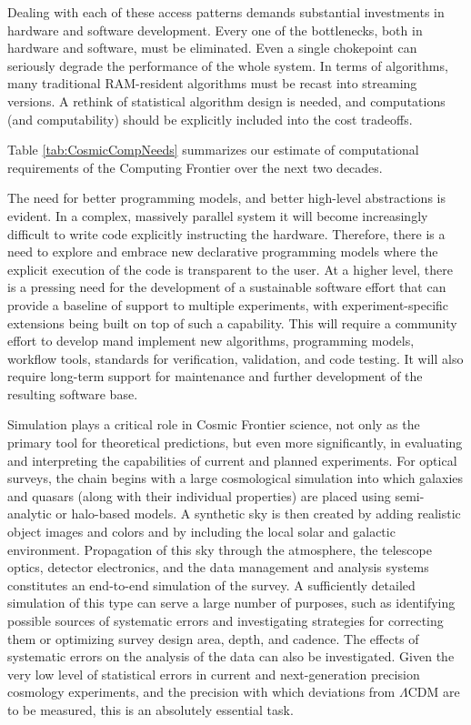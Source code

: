 Dealing with each of these access patterns demands substantial
investments in hardware and software development. 
Every one of the bottlenecks, both in
hardware and software, must be eliminated.  Even a single chokepoint can
seriously degrade the performance of the whole system. In terms of
algorithms, many traditional RAM-resident algorithms must be recast
into streaming versions. A rethink of statistical algorithm design is
needed, and computations (and computability) should be explicitly
included into the cost tradeoffs.

Table \ref{tab:CosmicCompNeeds} summarizes our estimate of 
computational requirements of the Computing Frontier over the next two decades.

The need for better programming models, and better high-level
abstractions is evident. In a complex, massively parallel system it
will become increasingly difficult to write code explicitly
instructing the hardware. Therefore, there is a need to explore and
embrace new declarative programming models where the explicit
execution of the code is transparent to the user. At a higher level,
there is a pressing need for the development of a sustainable software
effort that can provide a baseline of support to multiple experiments,
with experiment-specific extensions being built on top of such a
capability. This will require a community effort to develop mand implement
new algorithms, programming models, workflow
tools, standards for verification, validation, and code testing.
It will also require
long-term support for maintenance and further development of the
resulting software base.

Simulation plays a critical role in
Cosmic Frontier science, not only as the primary tool for theoretical
predictions, but even more significantly, in evaluating and
interpreting the capabilities of current and planned experiments. For
optical surveys, the chain begins with a large cosmological simulation
into which galaxies and quasars (along with their individual
properties) are placed using semi-analytic or halo-based models. A
synthetic sky is then created by adding realistic object images and
colors and by including the local solar and galactic
environment. Propagation of this sky through the atmosphere, the
telescope optics, detector electronics, and the data management and
analysis systems constitutes an end-to-end simulation of the survey. A
sufficiently detailed simulation of this type can serve a large number
of purposes, such as identifying possible sources of systematic errors
and investigating strategies for correcting them or optimizing
survey design area, depth, and cadence. The effects of systematic
errors on the analysis of the data can also be investigated.  Given the
very low level of statistical errors in current and next-generation
precision cosmology experiments, and the precision with which
deviations from $\Lambda$CDM are to be measured, this is an absolutely
essential task.

